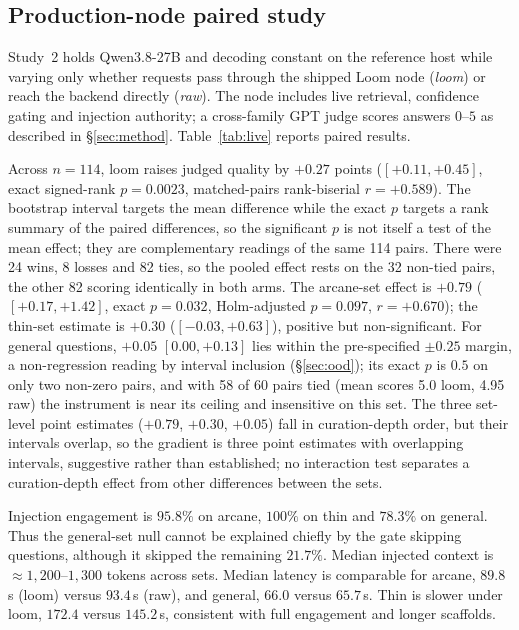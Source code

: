 \documentclass[10pt,twocolumn]{article}
\begin{document}
\subsection{Production-node paired study}\label{sec:live}
Study~2 holds Qwen3.8-27B and decoding constant on the reference host while varying only whether requests pass through the shipped Loom node (\emph{loom}) or reach the backend directly (\emph{raw}). The node includes live retrieval, confidence gating and injection authority; a cross-family GPT judge scores answers $0$--$5$ as described in \S\ref{sec:method}. Table~\ref{tab:live} reports paired results.

Across $n=114$, loom raises judged quality by $\mathbf{+0.27}$ points ($[+0.11,+0.45]$, exact signed-rank $p=0.0023$, matched-pairs rank-biserial $r=+0.589$). The bootstrap interval targets the mean difference while the exact $p$ targets a rank summary of the paired differences, so the significant $p$ is not itself a test of the mean effect; they are complementary readings of the same 114 pairs. There were 24 wins, 8 losses and 82 ties, so the pooled effect rests on the 32 non-tied pairs, the other 82 scoring identically in both arms. The arcane-set effect is $\mathbf{+0.79}$ ($[+0.17,+1.42]$, exact $p=0.032$, Holm-adjusted $p=0.097$, $r=+0.670$); the thin-set estimate is $+0.30$ ($[-0.03,+0.63]$), positive but non-significant. For general questions, $+0.05$ $[0.00,+0.13]$ lies within the pre-specified $\pm0.25$ margin, a non-regression reading by interval inclusion (\S\ref{sec:ood}); its exact $p$ is $0.5$ on only two non-zero pairs, and with 58 of 60 pairs tied (mean scores 5.0 loom, 4.95 raw) the instrument is near its ceiling and insensitive on this set. The three set-level point estimates ($+0.79$, $+0.30$, $+0.05$) fall in curation-depth order, but their intervals overlap, so the gradient is three point estimates with overlapping intervals, suggestive rather than established; no interaction test separates a curation-depth effect from other differences between the sets.

Injection engagement is $95.8\%$ on arcane, $100\%$ on thin and $78.3\%$ on general. Thus the general-set null cannot be explained chiefly by the gate skipping questions, although it skipped the remaining $21.7\%$. Median injected context is $\approx1{,}200$--$1{,}300$ tokens across sets. Median latency is comparable for arcane, $89.8$\,s (loom) versus $93.4$\,s (raw), and general, $66.0$ versus $65.7$\,s. Thin is slower under loom, $172.4$ versus $145.2$\,s, consistent with full engagement and longer scaffolds.
\end{document}
